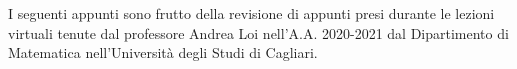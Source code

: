 I seguenti appunti sono frutto della revisione di appunti presi durante le lezioni virtuali tenute dal professore Andrea Loi nell'A.A. 2020-2021 dal Dipartimento di Matematica nell'Università degli Studi di Cagliari.